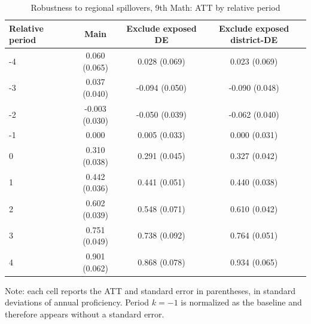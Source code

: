 ﻿\begin{table}[!htbp]
\centering
\caption{Robustness to regional spillovers, 9th Math: ATT by relative period}
\label{tab:ap_event_spillover_9th_mat}
\vspace{-0.15cm}
\scriptsize
\setlength{\tabcolsep}{4pt}
\renewcommand{\arraystretch}{0.92}
\begin{tabular}{lccc}
\toprule
Relative period & Main & Exclude exposed DE & Exclude exposed district-DE \\
\midrule
-4 & 0.060 (0.065) & 0.028 (0.069) & 0.023 (0.069) \\
-3 & 0.037 (0.040) & -0.094 (0.050) & -0.090 (0.048) \\
-2 & -0.003 (0.030) & -0.050 (0.039) & -0.062 (0.040) \\
-1 & 0.000 & 0.005 (0.033) & 0.000 (0.031) \\
0 & 0.310 (0.038) & 0.291 (0.045) & 0.327 (0.042) \\
1 & 0.442 (0.036) & 0.441 (0.051) & 0.440 (0.038) \\
2 & 0.602 (0.039) & 0.548 (0.071) & 0.610 (0.042) \\
3 & 0.751 (0.049) & 0.738 (0.092) & 0.764 (0.051) \\
4 & 0.901 (0.062) & 0.868 (0.078) & 0.934 (0.065) \\
\bottomrule
\end{tabular}
\begin{flushleft}
\footnotesize Note: each cell reports the ATT and standard error in parentheses, in standard deviations of annual proficiency. Period \(k=-1\) is normalized as the baseline and therefore appears without a standard error.
\end{flushleft}
\end{table}




